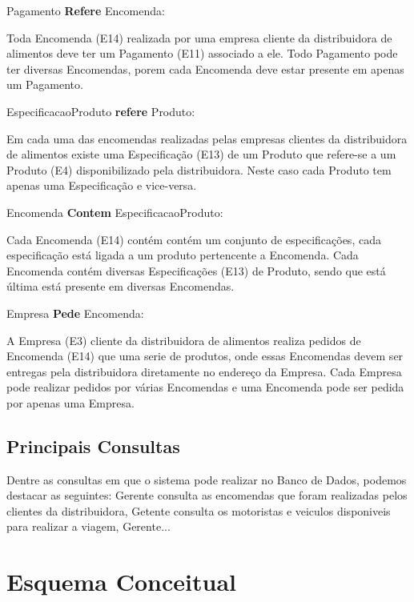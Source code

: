 \documentclass[12pt, onecolumn, titlepage]{article}
\begin{document}
\begin{description}
\item Pagamento \textbf{Refere} Encomenda: 
\item \qquad Toda Encomenda (E14) realizada por uma empresa cliente da distribuidora de alimentos deve ter um Pagamento (E11) associado a ele. Todo Pagamento pode ter diversas Encomendas, porem cada Encomenda deve estar presente em apenas um Pagamento.

\item EspecificacaoProduto \textbf{refere} Produto: 
\item \qquad Em cada uma das encomendas realizadas pelas empresas clientes da distribuidora de alimentos existe uma Especificação (E13) de um Produto que refere-se a um Produto (E4) disponibilizado pela distribuidora. Neste caso cada Produto tem apenas uma Especificação e vice-versa. 

\item Encomenda \textbf{Contem} EspecificacaoProduto: 
\item \qquad Cada Encomenda (E14) contém contém um conjunto de especificações, cada especificação está ligada a um produto pertencente a Encomenda. Cada Encomenda contém diversas Especificações (E13) de Produto, sendo que está última está presente em diversas Encomendas.

\item Empresa \textbf{Pede} Encomenda: 
\item \qquad A Empresa (E3) cliente da distribuidora de alimentos realiza pedidos de Encomenda (E14) que uma serie de produtos, onde essas Encomendas devem ser entregas pela distribuidora diretamente no endereço da Empresa. Cada Empresa pode realizar pedidos por várias Encomendas e uma Encomenda pode ser pedida por apenas uma Empresa.

\end{description}

\subsection*{Principais Consultas}
\label{sect:principaisConsultas}

Dentre as consultas em que o sistema pode realizar no Banco de Dados, podemos destacar as seguintes: Gerente consulta as encomendas que foram realizadas pelos clientes da distribuidora, Getente consulta os motoristas e veiculos disponiveis para realizar a viagem, Gerente...

\section{Esquema Conceitual}
\label{sect:conceitual}
\end{document}
